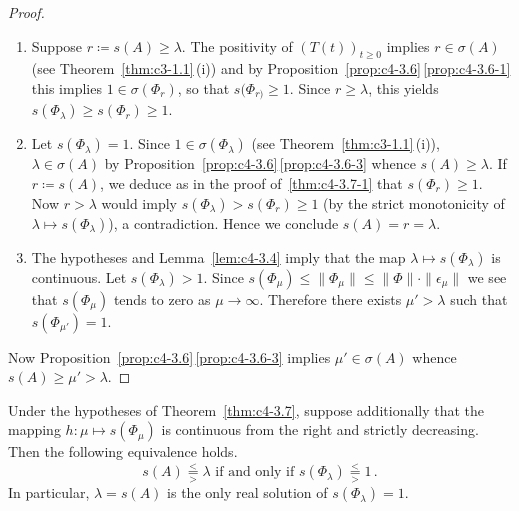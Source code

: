 \begin{proof}
\begin{enumerate}[\upshape (i), wide, labelindent=.25em] 
\item%
Suppose $r \coloneqq s(A) \geq \lambda$. 
The positivity of\/ $(T(t))_{t \geq 0}$ implies $r \in \sigma(A)$ (see Theorem~\ref{thm:c3-1.1}\,(i)) and by Proposition~\ref{prop:c4-3.6}\,\ref{prop:c4-3.6-1}  this implies $1 \in \sigma(\Phi_r)$, so that $s(\Phi_{r)} \geq 1$. 
Since $r \geq \lambda$, this yields $s(\Phi_{\lambda}) \geq s(\Phi_{r}) \geq 1$.

\item 
Let $s(\Phi_{\lambda}) = 1$. 
Since $1 \in \sigma(\Phi_{\lambda})$ (see Theorem~\ref{thm:c3-1.1}\,(i)), $\lambda \in \sigma(A)$ by Proposition~\ref{prop:c4-3.6}\,\ref{prop:c4-3.6-3} whence $s(A) \geq \lambda$. 
If\/ $r \coloneqq s(A)$, we deduce as in the proof of~\ref{thm:c4-3.7-1} that $s(\Phi_{r}) \geq 1$. 
Now $r > \lambda$ would imply $s(\Phi_{\lambda}) > s(\Phi_{r}) \geq 1$ (by the strict monotonicity of\/ $\lambda \mapsto s(\Phi_{\lambda})$), a contradiction. Hence we conclude $s(A) = r = \lambda$.

\item 
The hypotheses and Lemma~\ref{lem:c4-3.4} imply that the map $\lambda \mapsto s(\Phi_{\lambda})$ is continuous. 
Let $s(\Phi_{\lambda}) > 1$. 
Since $s(\Phi_{\mu}) \leq \|\Phi_{\mu}\| \leq \|\Phi\| \cdot \|\epsilon_{\mu}\|$ we see that $s(\Phi_{\mu})$ tends to zero as $\mu \to \infty$. 
Therefore there exists $\mu' > \lambda$ such that $s(\Phi_{\mu'}) = 1$. 
\end{enumerate} 
Now Proposition~\ref{prop:c4-3.6}\,\ref{prop:c4-3.6-3}  implies $\mu' \in \sigma(A)$ whence $s(A) \geq \mu' > \lambda$.
\end{proof}
\begin{corollary}\label{cor:c4-3.8}
%
Under the hypotheses of Theorem~\ref{thm:c4-3.7}, suppose additionally that the mapping $h: \mu \mapsto s(\Phi_{\mu})$ is continuous from the right and strictly decreasing. Then the following equivalence holds.
\begin{equation}\label{eq:c4-3.9}
s(A) 
\overset{<}{ \underset{>}{=} }
\lambda 
\text{ if and only if } 
s(\Phi_{\lambda}) 
\overset{<}{ \underset{>}{=} }
1\,.
\end{equation}
In particular, $\lambda = s(A)$ is the only real solution of\/ $s(\Phi_{\lambda}) = 1$.
\end{corollary}
